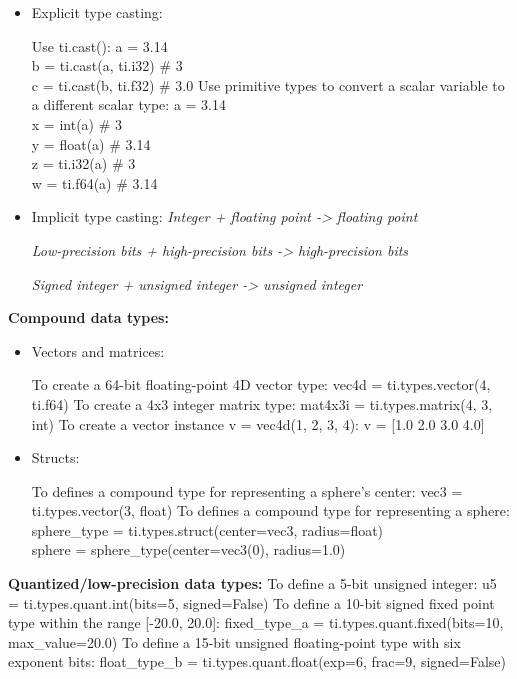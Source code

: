 \documentclass[10pt,landscape,a4paper]{article}
\newenvironment{myboxed}[1]
{\begin{mdframed}[linecolor=black,
                  backgroundcolor=white,
                  outerlinewidth=0.25pt,
                  innertopmargin=1ex,
                  topline=true,
                  rightline=true,
                  leftline=true,
                  bottomline=true,
                  linecolor=black!0,
                  frametitleaboveskip=0.5em,
                  frametitlebelowskip=0.5em,
                  innerbottommargin=.5\baselineskip,
                  innerrightmargin=.5em,
                  innerleftmargin=.5em,
                  frametitle={\footnotesize \RobotoSlab \bfseries \hspace*{0mm} #1},
                  frametitlebackgroundcolor=black!5,
                  frametitlerulewidth=2pt]}
{\end{mdframed}}
\begin{document}
\begin{multicols*}{5}
\begin{myboxed}{Data Types \hfill}
\begin{itemize}
  \item Explicit type casting:

  Use ti.cast():
  {\ttfamily \scriptsize
  a = 3.14 \\
  b = ti.cast(a, ti.i32)  # 3 \\
  c = ti.cast(b, ti.f32)  # 3.0}
  Use primitive types to convert a scalar variable to a different scalar type:
  {\ttfamily \scriptsize
  a = 3.14 \\
  x = int(a)    # 3 \\
  y = float(a)  # 3.14 \\
  z = ti.i32(a) # 3 \\
  w = ti.f64(a) # 3.14}

  \item Implicit type casting:
  \textit{Integer + floating point -> floating point}

  \textit{Low-precision bits + high-precision bits -> high-precision bits}

  \textit{Signed integer + unsigned integer -> unsigned integer}

  \end{itemize}

  \textbf{Compound data types:}

  \begin{itemize}
  \item Vectors and matrices:

  To create a 64-bit floating-point 4D vector type:
  {\ttfamily \scriptsize
  vec4d = ti.types.vector(4, ti.f64)}
  To create a 4x3 integer matrix type:
  {\ttfamily \scriptsize
  mat4x3i = ti.types.matrix(4, 3, int)}
  To create a vector instance v = vec4d(1, 2, 3, 4):
  {\ttfamily \scriptsize
  v = [1.0 2.0 3.0 4.0]}

  \item Structs:

  To defines a compound type for representing a sphere's center:
  {\ttfamily \scriptsize
  vec3 = ti.types.vector(3, float)}
  To defines a compound type for representing a sphere:
  {\ttfamily \scriptsize
  sphere_type = ti.types.struct(center=vec3, radius=float) \\
  sphere = sphere_type(center=vec3(0), radius=1.0)}

  \end{itemize}

  \textbf{Quantized/low-precision data types:}
  To define a 5-bit unsigned integer:
  {\ttfamily \scriptsize
  u5 = ti.types.quant.int(bits=5, signed=False)}
  To define a 10-bit signed fixed point type within the range [-20.0, 20.0]:
  {\ttfamily \scriptsize
  fixed_type_a = ti.types.quant.fixed(bits=10, max_value=20.0)}
  To define a 15-bit unsigned floating-point type with six exponent bits:
  {\ttfamily \scriptsize
  float_type_b = ti.types.quant.float(exp=6, frac=9, signed=False)}


\end{myboxed}
\end{multicols*}
\end{document}
